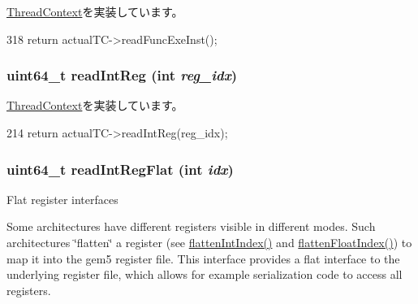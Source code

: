 \hyperlink{classThreadContext_ae9aa32b63846c7bae5f2b6d899bdbf9c}{ThreadContext}を実装しています。


\begin{DoxyCode}
318 { return actualTC->readFuncExeInst(); }
\end{DoxyCode}
\hypertarget{classCheckerThreadContext_a21c850cd41ab977a2cf3450fe66ec25a}{
\subsubsection[{readIntReg}]{\setlength{\rightskip}{0pt plus 5cm}uint64\_\-t readIntReg (int {\em reg\_\-idx})}}
\label{classCheckerThreadContext_a21c850cd41ab977a2cf3450fe66ec25a}


\hyperlink{classThreadContext_af80734776d68e6acd48e22f6c999394a}{ThreadContext}を実装しています。


\begin{DoxyCode}
214     { return actualTC->readIntReg(reg_idx); }
\end{DoxyCode}
\hypertarget{classCheckerThreadContext_aed7abd4afcb954f8612e4ef1fe73317a}{
\subsubsection[{readIntRegFlat}]{\setlength{\rightskip}{0pt plus 5cm}uint64\_\-t readIntRegFlat (int {\em idx})}}
\label{classCheckerThreadContext_aed7abd4afcb954f8612e4ef1fe73317a}
Flat register interfaces

Some architectures have different registers visible in different modes. Such architectures \char`\"{}flatten\char`\"{} a register (see \hyperlink{classCheckerThreadContext_aa529f2d70520c578e3e29b3bf1a66312}{flattenIntIndex()} and \hyperlink{classCheckerThreadContext_ab9ea3f8f1a21df875c7273c7377dfac1}{flattenFloatIndex()}) to map it into the gem5 register file. This interface provides a flat interface to the underlying register file, which allows for example serialization code to access all registers. 

